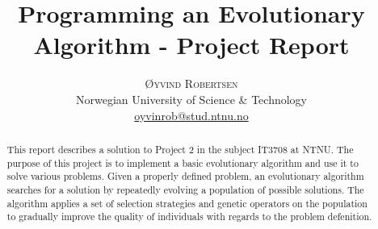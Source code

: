 \documentclass[twoside]{article}
\title{\vspace{-15mm}\fontsize{18pt}{10pt}\selectfont\textbf{Programming an Evolutionary Algorithm - Project Report}} %
\author{
    \large
    \textsc{Øyvind Robertsen} \\ %
    \normalsize Norwegian University of Science \& Technology \\ %
    \normalsize \href{mailto:oyvinrob@stud.ntnu.no}{oyvinrob@stud.ntnu.no} %
    \vspace{-5mm}
}
\date{}
\begin{document}
\maketitle %

\thispagestyle{fancy} %


\begin{abstract}

\noindent This report describes a solution to Project 2 in the subject IT3708 at NTNU. 
The purpose of this project is to implement a basic evolutionary algorithm and use it to solve various problems.
Given a properly defined problem, an evolutionary algorithm searches for a solution by repeatedly evolving a population of possible solutions.
The algorithm applies a set of selection strategies and genetic operators on the population to gradually improve the quality of individuals with regards to the problem defenition.

\end{abstract}

\end{document}
